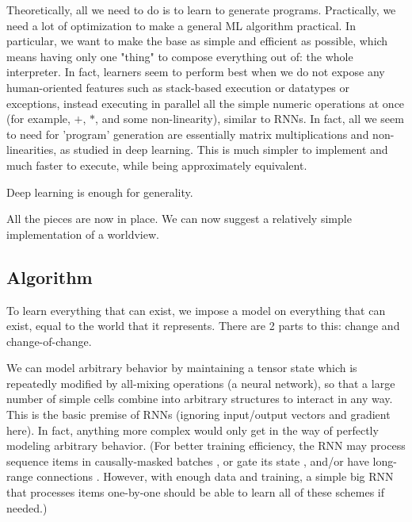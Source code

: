 \documentclass{article}
\begin{document}
\begin{itemize}
Theoretically, all we need to do is to learn to generate programs. Practically, we need a lot of optimization to make a general ML algorithm practical. In particular, we want to make the base as simple and efficient as possible, which means having only one "thing" to compose everything out of: the whole interpreter. In fact, learners seem to perform best when we do not expose any human-oriented features such as stack-based execution or datatypes or exceptions, instead executing in parallel all the simple numeric operations at once (for example, $+$, $*$, and some non-linearity), similar to RNNs. In fact, all we seem to need for 'program' generation are essentially matrix multiplications and non-linearities, as studied in deep learning. This is much simpler to implement and much faster to execute, while being approximately equivalent.

Deep learning is enough for generality.
\end{itemize}

All the pieces are now in place. We can now suggest a relatively simple implementation of a worldview.

\subsection{Algorithm\label{Algorithm}}

To learn everything that can exist, we impose a model on everything that can exist, equal to the world that it represents. There are 2 parts to this: change and change-of-change.

We can model arbitrary behavior by maintaining a tensor state which is repeatedly modified by all-mixing operations (a neural network), so that a large number of simple cells combine into arbitrary structures to interact in any way. This is the basic premise of RNNs (ignoring input/output vectors and gradient here). In fact, anything more complex would only get in the way of perfectly modeling arbitrary behavior. (For better training efficiency, the RNN may process sequence items in causally-masked batches \cite{NEURIPS2020_1457c0d6}, or gate its state \cite{hochreiter1997lstm} \cite{cho2014learning}, and/or have long-range connections \cite{dieng2017topicrnn}. However, with enough data and training, a simple big RNN that processes items one-by-one should be able to learn all of these schemes if needed.)
\end{document}

